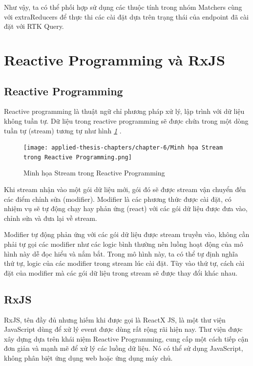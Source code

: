 Như vậy, ta có thể phối hợp sử dụng các thuộc tính trong nhóm Matchers cùng với extraReducers để thực thi các cài đặt dựa trên trạng thái của endpoint đã cài đặt với RTK Query.

\section{Reactive Programming và RxJS} \label{sec:RxJS}

\subsection{Reactive Programming}

\tab Reactive programming là thuật ngữ chỉ phương pháp xử lý, lập trình với dữ liệu không tuần tự.
Dữ liệu trong reactive programming sẽ được chứa trong một dòng tuần tự (stream) tương tự như hình \textit{\ref{fig:StreamInRP} }.

\begin{figure}[H]
      \centering
      \texttt{[image: applied-thesis-chapters/chapter-6/Minh họa Stream trong Reactive Programming.png]}
      \caption{Minh họa Stream trong Reactive Programming \cite{chap4bib4}}
      \label{fig:StreamInRP}
\end{figure}

Khi stream nhận vào một gói dữ liệu mới, gói đó sẽ được stream vận chuyển đến các điểm chỉnh sửa (modifier).
Modifier là các phương thức được cài đặt, có nhiệm vụ sẽ tự động chạy hay phản ứng (react) với các gói dữ liệu được đưa vào, chỉnh sửa và đưa lại về stream.
\par

Modifier tự động phản ứng với các gói dữ liệu được stream truyền vào, không cần phải tự gọi các modifier như các logic bình thường nên luồng hoạt động của mô hình này dễ đọc hiểu và nắm bắt.
Trong mô hình này, ta có thể tự định nghĩa thứ tự, logic của các modifier trong stream lúc cài đặt.
Tùy vào thứ tự, cách cài đặt của modifier mà các gói dữ liệu trong stream sẽ được thay đổi khác nhau.

\subsection{RxJS}

\tab RxJS, tên đầy đủ nhưng hiếm khi được gọi là ReactX JS, là một thư viện JavaScript dùng để xử lý event được dùng rất rộng rãi hiện nay.
Thư viện được xây dựng dựa trên khái niệm Reactive Programming, cung cấp một cách tiếp cận đơn giản và mạnh mẽ để xử lý các luồng dữ liệu.
Nó có thể sử dụng JavaScript, không phân biệt ứng dụng web hoặc ứng dụng máy chủ.
\par


